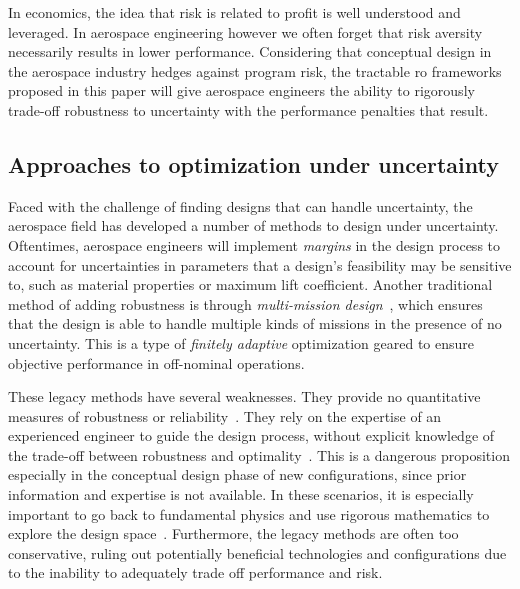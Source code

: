 In economics, the idea that risk is related to profit is well understood and leveraged.
In aerospace engineering however we often forget that risk aversity necessarily results in lower performance.
Considering that conceptual design in the aerospace industry hedges against program risk,
the tractable \gls{ro} frameworks proposed in this paper will
give aerospace engineers the ability to rigorously trade-off robustness to uncertainty with the performance penalties
that result.

\subsection{Approaches to optimization under uncertainty}
\label{sec:approaches}

Faced with the challenge of finding designs that can handle uncertainty,
the aerospace field has developed a number of methods to
design under uncertainty. Oftentimes, aerospace engineers will implement
\emph{margins} in the design process to account for uncertainties in parameters that a design's feasibility
may be sensitive to, such as material properties or maximum lift coefficient.
Another traditional method of adding robustness is through \emph{multi-mission design}~\cite{York2018},
which ensures that the design is able to handle
multiple kinds of missions in the presence of no uncertainty. This is a type of \emph{finitely
adaptive} optimization geared to ensure objective performance in off-nominal operations.

These legacy methods have several weaknesses. They provide no quantitative measures of
robustness or reliability~\cite{Zang2002}. They rely on the expertise of an experienced
engineer to guide the design process, without explicit knowledge of the trade-off between
robustness and optimality~\cite{Yao2011}. This is a dangerous proposition especially in the
conceptual design phase of new configurations, since prior information and expertise is not
available. In these scenarios, it is especially important to go back to fundamental physics
and use rigorous mathematics to explore the design space~\cite{York2018}. Furthermore,
the legacy methods are often too conservative, ruling out potentially beneficial technologies
and configurations due to the inability to adequately trade off performance and risk.

